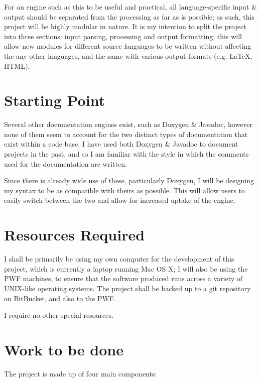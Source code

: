 For an engine such as this to be useful and practical, all
language-specific input \& output should be separated from the
processing as far as is possible; as such, this project will be highly
modular in nature. It is my intention to split the project into three
sections: input parsing, processing and output formatting; this will
allow new modules for different source languages to be written without
affecting the any other languages, and the same with various output
formats (e.g. \LaTeX, HTML).

\pagebreak

\section{Starting Point}

Several other documentation engines exist, such as Doxygen \& Javadoc,
however none of them seem to account for the two distinct types of
documentation that exist within a code base. I have used both Doxygen
\& Javadoc to document projects in the past, and so I am familiar with
the style in which the comments used for the documentation are
written.

Since there is already wide use of these, particularly Doxygen, I will
be designing my syntax to be as compatible with theirs as
possible. This will allow users to easily switch between the two and
allow for increased uptake of the engine.

\section{Resources Required}

I shall be primarily be using my own computer for the development of
this project, which is currently a laptop running Mac OS X; I will
also be using the PWF machines, to ensure that the software produced
runs across a variety of UNIX-like operating systems. The project
shall be backed up to a git repository on BitBucket, and also to the
PWF.

I require no other special resources.

\section{Work to be done}

The project is made up of four main components:

